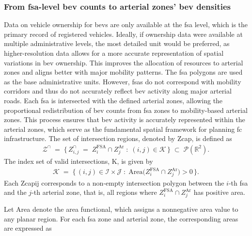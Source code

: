 \subsubsection{From \gls{fsa}-level \gls{bev} counts to arterial zones' \gls{bev} densities}\label{sec:Ev_density_for AZ}
Data on vehicle ownership for \gls{bev}s are only available at the \gls{fsa} level, which is the primary record of registered vehicles. Ideally, if ownership data were available at multiple administrative levels, the most detailed unit would be preferred, as higher-resolution data allows for a more accurate representation of spatial variations in \gls{bev} ownership. This improves the allocation of resources to arterial zones and aligns better with major mobility patterns.
The \gls{fsa} polygons are used as the base administrative units. However, \glspl{fsa} do not correspond with mobility corridors and thus do not accurately reflect \gls{bev} activity along major arterial roads. Each \gls{fsa} is intersected with the defined arterial zones, allowing the proportional redistribution of \gls{bev} counts from \gls{fsa} zones to mobility-based arterial zones. This process ensures that \gls{bev} activity is accurately represented within the arterial zones, which serve as the fundamental spatial framework for planning \gls{fc} infrastructure.
The set of intersection regions, denoted by \gls{Zcap}, is defined as
\begin{align}
  \mathcal{Z}^{\cap} 
  \;=\; \bigl\{\, Z^{\cap}_{i,j} \;=\; Z^{\mathrm{FSA}}_i \cap Z^{\mathrm{Ar}}_j \;:\; (i,j)\in\mathcal{K} \,\bigr\}
  \;\subset\; \mathcal{P}(\mathbb{R}^2).
  \label{eq:intersections set}
\end{align}
The index set of valid intersections, \gls{K}, is given by
\begin{align}
  \mathcal{K} \;=\; 
  \bigl\{\, (i,j) \in \mathcal{I}\times\mathcal{J} \;:\;
  \mathrm{Area}\bigl(Z^{\mathrm{FSA}}_i \cap Z^{\mathrm{Ar}}_j\bigr) > 0 \,\bigr\}.
\end{align}
Each \gls{Zcapij} corresponds to a non-empty intersection polygon between the $i$-th \gls{fsa} and the $j$-th arterial zone, that is, all regions where $Z^{\mathrm{FSA}}_i \cap Z^{\mathrm{Ar}}_j$ has positive area.

Let \gls{Area} denote the area functional, which assigns a nonnegative area value to any planar region.
For each \gls{fsa} zone and arterial zone, the corresponding areas are expressed as 

